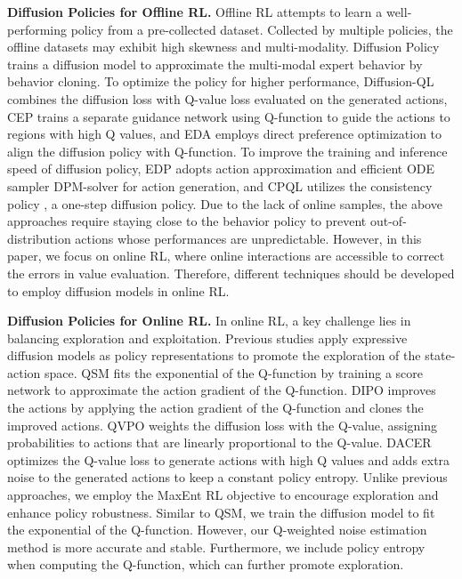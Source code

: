\textbf{Diffusion Policies for Offline RL.} Offline RL attempts to learn a well-performing policy from a pre-collected dataset. Collected by multiple policies, the offline datasets may exhibit high skewness and multi-modality. Diffusion Policy \cite{chi2023diffusion} trains a diffusion model to approximate the multi-modal expert behavior by behavior cloning. To optimize the policy for higher performance, Diffusion-QL \cite{wangdiffusion} combines the diffusion loss with Q-value loss evaluated on the generated actions, CEP \cite{lu2023contrastive} trains a separate guidance network using Q-function to guide the actions to regions with high Q values, and EDA \cite{chenaligning} employs direct preference optimization to align the diffusion policy with Q-function. To improve the training and inference speed of diffusion policy, EDP \cite{kang2024efficient} adopts action approximation and efficient ODE sampler DPM-solver for action generation, and CPQL \cite{chen2024boosting} utilizes the consistency policy \cite{song2023consistency}, a one-step diffusion policy. Due to the lack of online samples, the above approaches require staying close to the behavior policy to prevent out-of-distribution actions whose performances are unpredictable. However, in this paper, we focus on online RL, where online interactions are accessible to correct the errors in value evaluation. Therefore, different techniques should be developed to employ diffusion models in online RL.

\textbf{Diffusion Policies for Online RL.} In online RL, a key challenge lies in balancing exploration and exploitation. Previous studies \cite{psenkalearning,yang2023policy,ding2024diffusion,wang2024diffusion} apply expressive diffusion models as policy representations to promote the exploration of the state-action space. QSM \cite{psenkalearning} fits the exponential of the Q-function by training a score network to approximate the action gradient of the Q-function. DIPO \cite{yang2023policy} improves the actions by applying the action gradient of the Q-function and clones the improved actions. QVPO \cite{ding2024diffusion} weights the diffusion loss with the Q-value, assigning probabilities to actions that are linearly proportional to the Q-value. DACER \cite{wang2024diffusion} optimizes the Q-value loss to generate actions with high Q values and adds extra noise to the generated actions to keep a constant policy entropy. Unlike previous approaches, we employ the MaxEnt RL objective to encourage exploration and enhance policy robustness. Similar to QSM, we train the diffusion model to fit the exponential of the Q-function. However, our Q-weighted noise estimation method is more accurate and stable. Furthermore, we include policy entropy when computing the Q-function, which can further promote exploration.